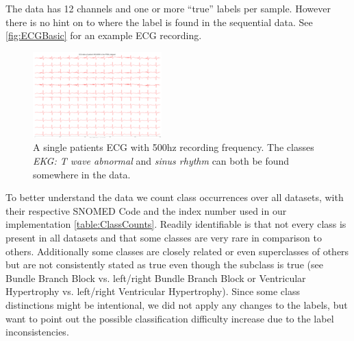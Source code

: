 The data has 12 channels and one or more \enquote{true} labels per sample. However there is no hint on to where the label is found in the sequential data. See \autoref{fig:ECGBasic} for an example ECG recording.
\begin{figure}[H]
	\includegraphics[width=\textwidth]{bilder/ecg-example0.png}
	\caption{A single patients ECG with 500hz recording frequency. The classes \textit{EKG: T wave abnormal} and \textit{sinus rhythm} can both be found somewhere in the data.}
	\label{fig:ECGBasic}
\end{figure}
To better understand the data we count class occurrences over all datasets, with their respective SNOMED Code and the index number used in our implementation \autoref{table:ClassCounts}. Readily identifiable is that not every class is present in all datasets and that some classes are very rare in comparison to others. Additionally some classes are closely related or even superclasses of others but are not consistently stated as true even though the subclass is true (see Bundle Branch Block vs. left/right Bundle Branch Block or Ventricular Hypertrophy vs. left/right Ventricular Hypertrophy). Since some class distinctions might be intentional, we did not apply any changes to the labels, but want to point out the possible classification difficulty increase due to the label inconsistencies. 


